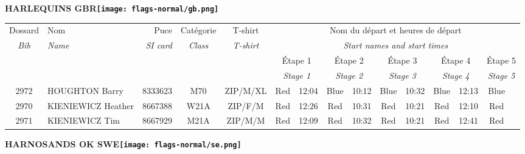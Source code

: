 \documentclass{report}
\begin{document}
\newpage
  \Huge \centering \bfseries HARLEQUINS  GBR\normalfont \footnotesize \sffamily \hfill \texttt{[image: flags-normal/gb.png]} \newline 
  \begin{longtable}{|c|l|r|c|c|*{5}{cc|}}
    Dossard & Nom  & Puce    & Catégorie & T-shirt & \multicolumn{10}{c|}{Nom du départ et heures de départ} \\
    \itshape Bib     & \itshape Name & \itshape SI card & \itshape Class  & \itshape  T-shirt  & \multicolumn{10}{c|}{\itshape Start names and start times} \\
    \hline
    & & & & & \multicolumn{2}{c|}{Étape 1} & \multicolumn{2}{c|}{Étape 2} & \multicolumn{2}{c|}{Étape 3} & \multicolumn{2}{c|}{Étape 4} & \multicolumn{2}{c|}{Étape 5} \\
    & & & & & \multicolumn{2}{c|}{\itshape Stage 1} & \multicolumn{2}{c|}{\itshape Stage 2} & \multicolumn{2}{c|}{\itshape Stage 3} & \multicolumn{2}{c|}{\itshape Stage 4} & \multicolumn{2}{c|}{\itshape Stage 5} \\
    \hline
    2972 & HOUGHTON Barry & 8333623 & M70 & ZIP/M/XL & Red & 12:04 & Blue & 10:12 & Blue & 10:32 & Blue & 12:13 & Blue &  \\
    2970 & KIENIEWICZ Heather & 8667388 & W21A & ZIP/F/M & Red & 12:26 & Red & 10:31 & Red & 10:21 & Red & 12:10 & Red &  \\
    2971 & KIENIEWICZ Tim & 8667929 & M21A & ZIP/M/M & Red & 12:09 & Red & 10:32 & Red & 10:21 & Red & 12:41 & Red &  \\
  \end{longtable}
\newpage
  \Huge \centering \bfseries HARNOSANDS OK  SWE\normalfont \footnotesize \sffamily \hfill \texttt{[image: flags-normal/se.png]} \newline 
\end{document}
